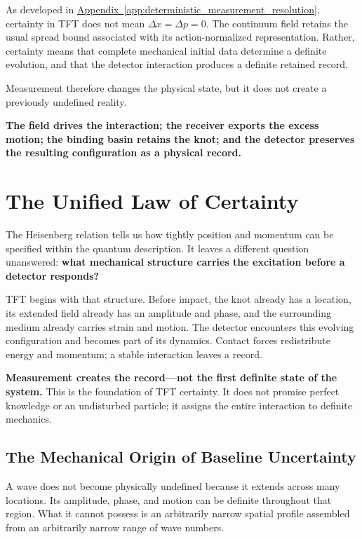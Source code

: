 As developed in \hyperref[app:deterministic_measurement_resolution]{Appendix~\ref*{app:deterministic_measurement_resolution}}, certainty in TFT does not mean $\Delta x = \Delta p = 0$. The continuum field retains the usual spread bound associated with its action-normalized representation. Rather, certainty means that complete mechanical initial data determine a definite evolution, and that the detector interaction produces a definite retained record.

Measurement therefore changes the physical state, but it does not create a previously undefined reality.

\textbf{The field drives the interaction; the receiver exports the excess motion; the binding basin retains the knot; and the detector preserves the resulting configuration as a physical record.}

\section{The Unified Law of Certainty}
\label{sec:unified_uncertainty}

The Heisenberg relation tells us how tightly position and momentum can be specified within the quantum description. It leaves a different question unanswered: \textbf{what mechanical structure carries the excitation before a detector responds?}

TFT begins with that structure. Before impact, the knot already has a location, its extended field already has an amplitude and phase, and the surrounding medium already carries strain and motion. The detector encounters this evolving configuration and becomes part of its dynamics. Contact forces redistribute energy and momentum; a stable interaction leaves a record.

\textbf{Measurement creates the record---not the first definite state of the system.} This is the foundation of TFT certainty. It does not promise perfect knowledge or an undisturbed particle; it assigns the entire interaction to definite mechanics.


\subsection{The Mechanical Origin of Baseline Uncertainty}

A wave does not become physically undefined because it extends across many locations. Its amplitude, phase, and motion can be definite throughout that region. What it cannot possess is an arbitrarily narrow spatial profile assembled from an arbitrarily narrow range of wave numbers.

